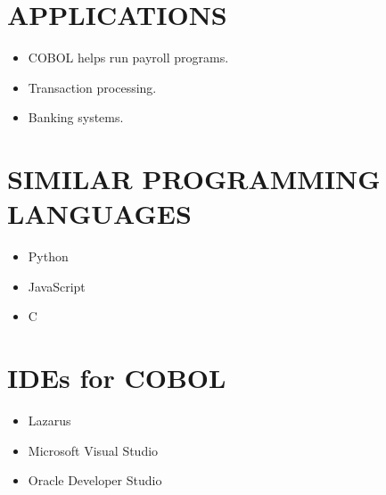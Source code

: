 \documentclass{article}
\begin{document}
	\section{APPLICATIONS}
	\begin{itemize}
		\item COBOL helps run payroll programs.
		\item Transaction processing.
		\item Banking systems.
	\end{itemize}
\section{SIMILAR PROGRAMMING LANGUAGES}
\begin{itemize}
	\item Python
	\item JavaScript
	\item C
\end{itemize}
\section{IDEs for COBOL}
\begin{itemize}
	\item Lazarus
	\item Microsoft Visual Studio
	\item Oracle Developer Studio 
\end{itemize}
\end{document}
